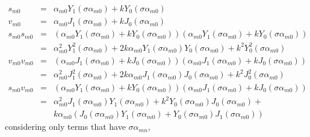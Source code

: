 \documentclass{article}
\begin{document}
\begin{eqnarray}
    s_{m0} &=& \alpha_{m0}Y_1(\sigma\alpha_{m0}) + kY_0(\sigma\alpha_{m0}) \nonumber\\
    v_{m0} &=& \alpha_{m0}J_1(\sigma\alpha_{m0}) + kJ_0(\sigma\alpha_{m0}) \nonumber\\
%
    s_{m0}s_{m0} &=& (\alpha_{m0}Y_1(\sigma\alpha_{m0}) + kY_0(\sigma\alpha_{m0}))
                     (\alpha_{m0}Y_1(\sigma\alpha_{m0}) + kY_0(\sigma\alpha_{m0}))
\nonumber\\
                 &=& \alpha_{m0}^2 Y_1^2(\sigma\alpha_{m0}) +
                     2k\alpha_{m0}Y_1(\sigma\alpha_{m0})Y_0(\sigma\alpha_{m0}) +
                     k^2Y_0^2(\sigma\alpha_{m0})
\nonumber\\
    v_{m0}v_{m0} &=& (\alpha_{m0}J_1(\sigma\alpha_{m0}) + kJ_0(\sigma\alpha_{m0}))
                     (\alpha_{m0}J_1(\sigma\alpha_{m0}) + kJ_0(\sigma\alpha_{m0}))
\nonumber\\
                 &=& \alpha_{m0}^2 J_1^2(\sigma\alpha_{m0}) +
                     2k\alpha_{m0}J_1(\sigma\alpha_{m0})J_0(\sigma\alpha_{m0}) +
                     k^2J_0^2(\sigma\alpha_{m0})
\nonumber\\
    s_{m0}v_{m0} &=& (\alpha_{m0}Y_1(\sigma\alpha_{m0}) + kY_0(\sigma\alpha_{m0}))
                     (\alpha_{m0}J_1(\sigma\alpha_{m0}) + kJ_0(\sigma\alpha_{m0}))
\nonumber\\
                 &=& \alpha_{m0}^2J_1(\sigma\alpha_{m0})Y_1(\sigma\alpha_{m0}) +
                      k^2Y_0(\sigma\alpha_{m0})J_0(\sigma\alpha_{m0}) +
\nonumber\\
                 & &  k\alpha_{m0}(J_0(\sigma\alpha_{m0})Y_1(\sigma\alpha_{m0}) +
                                   Y_0(\sigma\alpha_{m0})J_1(\sigma\alpha_{m0}))
\end{eqnarray}
%
considering only terms that have $\sigma\alpha_{mn}$,
%
\end{document}
